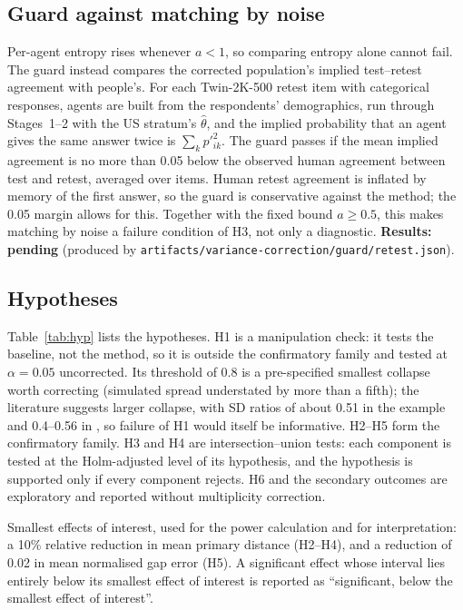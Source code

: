 \documentclass[11pt]{article}
\newcommand{\pending}[1]{\textbf{Results: pending} (produced by \nolinkurl{#1}).}
\begin{document}
\subsection{Guard against matching by noise}
\label{sec:noise}
Per-agent entropy rises whenever $a<1$, so comparing entropy alone cannot fail. The guard instead compares the corrected population's implied test--retest agreement with people's. For each Twin-2K-500 retest item with categorical responses, agents are built from the respondents' demographics, run through Stages~1--2 with the US stratum's $\hat\theta$, and the implied probability that an agent gives the same answer twice is $\sum_k p'^2_{ik}$. The guard passes if the mean implied agreement is no more than 0.05 below the observed human agreement between test and retest, averaged over items. Human retest agreement is inflated by memory of the first answer, so the guard is conservative against the method; the 0.05 margin allows for this. Together with the fixed bound $a\ge0.5$, this makes matching by noise a failure condition of H3, not only a diagnostic. \pending{artifacts/variance-correction/guard/retest.json}

\subsection{Hypotheses}
Table~\ref{tab:hyp} lists the hypotheses. H1 is a manipulation check: it tests the baseline, not the method, so it is outside the confirmatory family and tested at $\alpha=0.05$ uncorrected. Its threshold of 0.8 is a pre-specified smallest collapse worth correcting (simulated spread understated by more than a fifth); the literature suggests larger collapse, with SD ratios of about 0.51 in the \citet{bisbee2024synthetic} example and 0.4--0.56 in \citet{ozkan2026distribution}, so failure of H1 would itself be informative. H2--H5 form the confirmatory family. H3 and H4 are intersection--union tests: each component is tested at the Holm-adjusted level of its hypothesis, and the hypothesis is supported only if every component rejects. H6 and the secondary outcomes are exploratory and reported without multiplicity correction.

Smallest effects of interest, used for the power calculation and for interpretation: a 10\% relative reduction in mean primary distance (H2--H4), and a reduction of 0.02 in mean normalised gap error (H5). A significant effect whose interval lies entirely below its smallest effect of interest is reported as ``significant, below the smallest effect of interest''.
\end{document}
